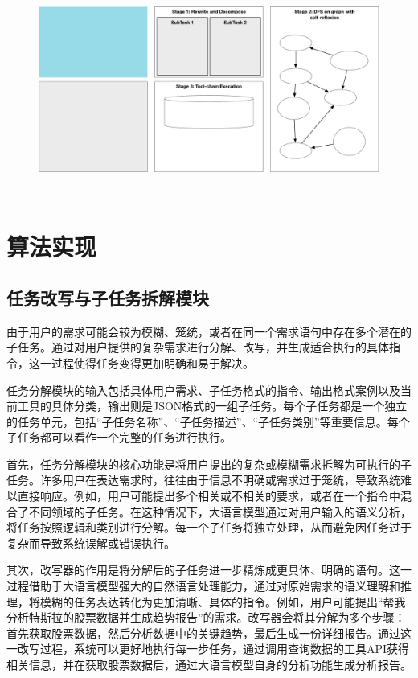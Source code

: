 \begin{figure}[!htp]
  \vspace{1em}
  \centering
  \setlength{\abovecaptionskip}{10pt} %
  \includegraphics[height=7cm]{../assets/ch3-1.pdf}
  \label{fig:SRR}
\end{figure}

\section{算法实现}

\subsection{任务改写与子任务拆解模块}

由于用户的需求可能会较为模糊、笼统，或者在同一个需求语句中存在多个潜在的子任务。通过对用户提供的复杂需求进行分解、改写，并生成适合执行的具体指令，这一过程使得任务变得更加明确和易于解决。

任务分解模块的输入包括具体用户需求、子任务格式的指令、输出格式案例以及当前工具的具体分类，输出则是JSON格式的一组子任务。每个子任务都是一个独立的任务单元，包括“子任务名称”、“子任务描述”、“子任务类别”等重要信息。每个子任务都可以看作一个完整的任务进行执行。

首先，任务分解模块的核心功能是将用户提出的复杂或模糊需求拆解为可执行的子任务。许多用户在表达需求时，往往由于信息不明确或需求过于笼统，导致系统难以直接响应。例如，用户可能提出多个相关或不相关的要求，或者在一个指令中混合了不同领域的子任务。在这种情况下，大语言模型通过对用户输入的语义分析，将任务按照逻辑和类别进行分解。每一个子任务将独立处理，从而避免因任务过于复杂而导致系统误解或错误执行。

其次，改写器的作用是将分解后的子任务进一步精炼成更具体、明确的语句。这一过程借助于大语言模型强大的自然语言处理能力，通过对原始需求的语义理解和推理，将模糊的任务表达转化为更加清晰、具体的指令。例如，用户可能提出“帮我分析特斯拉的股票数据并生成趋势报告”的需求。改写器会将其分解为多个步骤：首先获取股票数据，然后分析数据中的关键趋势，最后生成一份详细报告。通过这一改写过程，系统可以更好地执行每一步任务，通过调用查询数据的工具API获得相关信息，并在获取股票数据后，通过大语言模型自身的分析功能生成分析报告。

